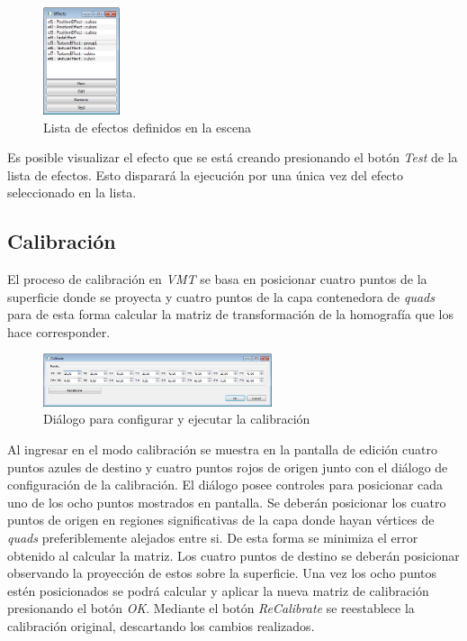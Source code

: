 \begin{figure}[H]
  \centering
    \includegraphics[width=0.2\textwidth]{./Cap5_vmt/vmt_Efects.png}
  \caption{Lista de efectos definidos en la escena}
  \label{fig:VMT-EffectList}
\end{figure}

Es posible visualizar el efecto que se está creando presionando el botón \emph{Test} de la lista de efectos. Esto disparará la ejecución por una única vez del efecto seleccionado en la lista.

\subsection{Calibración}

El proceso de calibración en \emph{VMT} se basa en posicionar cuatro puntos de la superficie donde se proyecta y cuatro puntos de la capa contenedora de \emph{quads} para de esta forma calcular la matriz de transformación de la homografía que los hace corresponder.

\begin{figure}[H]
  \centering
    \includegraphics[width=0.6\textwidth]{./Cap5_vmt/vmt_Calibrate.png}
  \caption{Diálogo para configurar y ejecutar la calibración}
  \label{fig:VMT-Calib}
\end{figure}

Al ingresar en el modo calibración se muestra en la pantalla de edición cuatro puntos azules de destino y cuatro puntos rojos de origen junto con el diálogo de configuración de la calibración.
El diálogo posee controles para posicionar cada uno de los ocho puntos mostrados en pantalla. Se deberán posicionar los cuatro puntos de origen en regiones significativas de la capa donde hayan vértices de \emph{quads} preferiblemente alejados entre si. De esta forma se minimiza el error obtenido al calcular la matriz.
Los cuatro puntos de destino se deberán posicionar observando la proyección de estos sobre la superficie. Una vez los ocho puntos estén posicionados se podrá calcular y aplicar la nueva matriz de calibración presionando el botón \emph{OK}.
Mediante el botón \emph{ReCalibrate} se reestablece la calibración original, descartando los cambios realizados.

